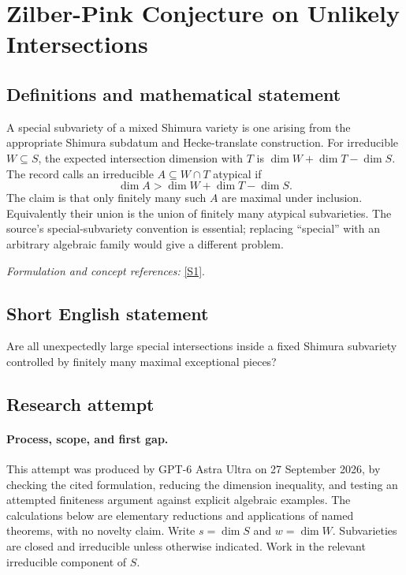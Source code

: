 \documentclass[11pt]{article}
\begin{document}
\section*{\texorpdfstring{Zilber-Pink Conjecture on Unlikely Intersections}{Zilber-Pink Conjecture on Unlikely Intersections}}\label{statement}
\subsection{Definitions and mathematical statement}
A special subvariety of a mixed Shimura variety is one arising from the appropriate Shimura subdatum and Hecke-translate construction. For irreducible $W\subseteq S$, the expected intersection dimension with $T$ is $\dim W+\dim T-\dim S$. The record calls an irreducible $A\subseteq W\cap T$ atypical if
\[
 \dim A>\dim W+\dim T-\dim S.
\]
The claim is that only finitely many such $A$ are maximal under inclusion. Equivalently their union is the union of finitely many atypical subvarieties. The source's special-subvariety convention is essential; replacing ``special'' with an arbitrary algebraic family would give a different problem.
\par\smallskip\textit{Formulation and concept references:} \href{https://ems.press/content/serial-article-files/52570}{[S1]}.

\subsection{Short English statement}
Are all unexpectedly large special intersections inside a fixed Shimura subvariety controlled by finitely many maximal exceptional pieces?
\subsection{Research attempt}
\paragraph{Process, scope, and first gap.}
This attempt was produced by GPT-6 Astra Ultra on 27 September 2026, by checking the cited formulation, reducing the dimension inequality, and testing an attempted finiteness argument against explicit algebraic examples. The calculations below are elementary reductions and applications of named theorems, with no novelty claim. Write $s=\dim S$ and $w=\dim W$. Subvarieties are closed and irreducible unless otherwise indicated. Work in the relevant irreducible component of $S$.
\end{document}
